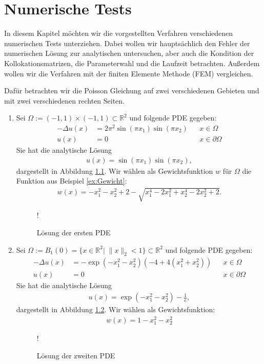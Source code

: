 \chapter{Numerische Tests}
\label{cha:NumerischeTests}

In diesem Kapitel möchten wir die vorgestellten Verfahren verschiedenen numerischen Tests unterziehen. Dabei wollen wir hauptsächlich den Fehler der numerischen Lösung zur analytischen untersuchen, aber auch die Kondition der Kollokationsmatrizen, die Parameterwahl und die Laufzeit betrachten. Außerdem wollen wir die Verfahren mit der finiten Elemente Methode (\acs{FEM}) vergleichen. 

Dafür betrachten wir die Poisson Gleichung auf zwei verschiedenen Gebieten und mit zwei verschiedenen rechten Seiten.
\begin{enumerate}
\item
Sei $\Omega := (-1,1) \times (-1,1) \subset \mathbb{R}^2$ und folgende \ac{PDE} gegeben:
\begin{align*}
- \Delta u (x) &= 2\pi^2 \sin(\pi x_1)\sin(\pi x_2)&& x \in \Omega\\
u (x) &= 0&& x \in \partial \Omega
\end{align*}
Sie hat die analytische Lösung 
\begin{align*}
u(x) = \sin(\pi x_1)\sin(\pi x_2),
\end{align*}
dargestellt in Abbildung \ref{fig:pde1sol}. Wir wählen als Gewichtsfunktion $w$ für $\Omega$ die Funktion aus Beispiel \ref{ex:Gewicht}:
\begin{align*}
w(x) = -x_1^2-x_2^2+2 - \sqrt{x_1^4 -2x_1^2 + x_2^4 -2x_2^2+2}.
\end{align*}
\begin{figure}[ht]
\centering
\resizebox {\columnwidth} {!} {

}
\caption{Lösung der ersten \acs{PDE}}
\label{fig:pde1sol}
\end{figure}
\item
Sei $\Omega := B_1(0) = \{x \in \mathbb{R}^2 |\; \|x\|_2 < 1\} \subset \mathbb{R}^2$ und folgende \ac{PDE} gegeben:
\begin{align*}
- \Delta u (x)&= -\exp(-x_1^2 -x_2^2)(-4+4(x_1^2+x_2^2)) && x  \in \Omega\\
u(x) &= 0&& x \in \partial \Omega
\end{align*}
Sie hat die analytische Lösung 
\begin{align*}
u(x) = \exp(-x_1^2-x_2^2) - \frac{1}{e},
\end{align*}  dargestellt in Abbildung \ref{fig:pde2sol}. Wir wählen als Gewichtsfunktion:
\begin{align*}
w(x) = 1 -x_1^2 -x_2^2
\end{align*}
\begin{figure}[ht]
\centering
\resizebox {\columnwidth} {!} {

}
\caption{Lösung der zweiten \acs{PDE}}
\label{fig:pde2sol}
\end{figure}
\end{enumerate}


